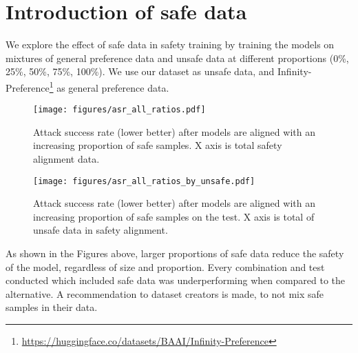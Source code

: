 \section{Introduction of safe data}\label{app:safe_data}

We explore the effect of safe data in safety training by training the models on mixtures of general preference data and unsafe data at different proportions (0\%, 25\%, 50\%, 75\%, 100\%). We use our dataset as unsafe data, and Infinity-Preference\footnote{\href{https://huggingface.co/datasets/BAAI/Infinity-Preference}{https://huggingface.co/datasets/BAAI/Infinity-Preference}} as general preference data.



\begin{figure}[h]
  \centering
  \texttt{[image: figures/asr\_all\_ratios.pdf]}
  \caption{Attack success rate (lower better) after models are aligned with an increasing proportion of safe samples. X axis is total safety alignment data.}\label{fig:safe_sizes}
\end{figure}

\begin{figure}[h]
  \centering
  \texttt{[image: figures/asr\_all\_ratios\_by\_unsafe.pdf]}
  \caption{Attack success rate (lower better) after models are aligned with an increasing proportion of safe samples on the \bscrt{} test. X axis is total of unsafe data in safety alignment.}\label{fig:safe_sizes2}
\end{figure}

As shown in the Figures above, larger proportions of safe data reduce the safety of the model, regardless of size and proportion. Every combination and test conducted which included safe data was underperforming when compared to the alternative. A recommendation to dataset creators is made, to not mix safe samples in their data. 


